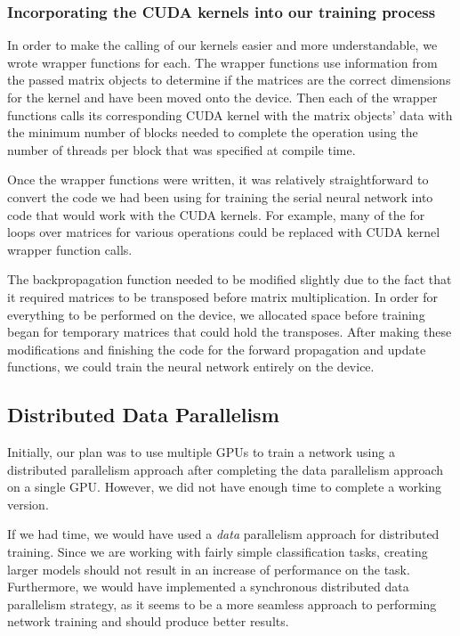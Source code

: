 \documentclass[11pt,a4paper]{article}
\begin{document}
\subsubsection{Incorporating the CUDA kernels into our training process}
In order to make the calling of our kernels easier and more understandable, we wrote wrapper functions for each. The wrapper functions use information from the passed matrix objects to determine if the matrices are the correct dimensions for the kernel and have been moved onto the device. Then each of the wrapper functions calls its corresponding CUDA kernel with the matrix objects' data with the minimum number of blocks needed to complete the operation using the number of threads per block that was specified at compile time.

Once the wrapper functions were written, it was relatively straightforward to convert the code we had been using for training the serial neural network into code that would work with the CUDA kernels. For example, many of the for loops over matrices for various operations could be replaced with CUDA kernel wrapper function calls.

The backpropagation function needed to be modified slightly due to the fact that it required matrices to be transposed before matrix multiplication. In order for everything to be performed on the device, we allocated space before training began for temporary matrices that could hold the transposes. After making these modifications and finishing the code for the forward propagation and update functions, we could train the neural network entirely on the device.

\subsection{Distributed Data Parallelism}
Initially, our plan was to use multiple GPUs to train a network using a distributed parallelism approach after completing the data parallelism approach on a single GPU. However, we did not have enough time to complete a working version. 

If we had time, we would have used a \textit{data} parallelism approach for distributed training. Since we are working with fairly simple classification tasks, creating larger models should not result in an increase of performance on the task. Furthermore, we would have implemented a synchronous distributed data parallelism strategy, as it seems to be a more seamless approach to performing network training and should produce better results. 
\end{document}
